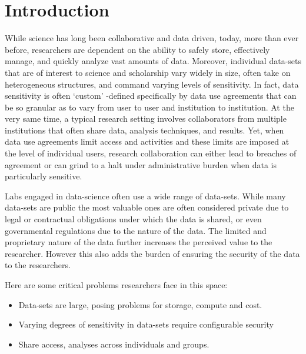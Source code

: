 \section{Introduction}



While science has long been collaborative and data driven, today, more than ever before, researchers are dependent on the ability to safely store, effectively manage, and quickly analyze vast amounts of
data. Moreover, individual data-sets that are of interest to science and scholarship vary widely in size, often take on heterogeneous structures, and command varying levels of sensitivity. In fact, data sensitivity is often `custom' -defined specifically by
data use agreements that can be so granular as to vary from user to user and institution to institution. At the very same time, a typical research setting involves collaborators from multiple institutions that often share data, analysis techniques, and results. Yet, when data use agreements limit access and activities and these limits are imposed at the level of individual users, research collaboration can either lead to breaches of agreement or can grind to a halt under administrative burden when data is particularly sensitive.



Labs engaged in data-science often use a wide range of data-sets. While many data-sets are public the most
valuable ones are often considered private due to legal or contractual obligations under which the data
is shared, or even governmental regulations due to the nature of the data. The limited and proprietary nature
of the data further increases the perceived value to the researcher. However this also adds the burden of
ensuring the security of the data to the researchers.


Here are some critical problems researchers face in this space:

\begin{itemize}
\item Data-sets are large, posing problems for storage, compute and cost.
\item Varying degrees of sensitivity in data-sets require configurable security
\item Share access, analyses across individuals and groups.
\end{itemize}





